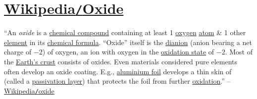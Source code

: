 \documentclass{article}
\begin{document}
\section{\href{https://en.wikipedia.org/wiki/Oxide}{Wikipedia\texttt{/}Oxide}}
``An \textit{oxide} is a \href{https://en.wikipedia.org/wiki/Chemical_compound}{chemical compound} containing at least 1 \href{https://en.wikipedia.org/wiki/Oxygen}{oxygen} \href{https://en.wikipedia.org/wiki/Atom}{atom} \& 1 other \href{https://en.wikipedia.org/wiki/Chemical_element}{element} in its \href{https://en.wikipedia.org/wiki/Chemical_formula}{chemical formula}. ``Oxide'' itself is the \href{https://en.wikipedia.org/wiki/Dianion}{dianion} (anion bearing a net charge of $-2$) of oxygen, an  ion with oxygen in the \href{https://en.wikipedia.org/wiki/Oxidation_state}{oxidation state} of $-2$. Most of the \href{https://en.wikipedia.org/wiki/Earth%27s_crust}{Earth's crust} consists of oxides. Even materials considered pure elements often develop an oxide coating. E.g., \href{https://en.wikipedia.org/wiki/Aluminium_foil}{aluminium foil} develops a thin skin of \ce{Al2O3} (called a \href{https://en.wikipedia.org/wiki/Passivation_(chemistry)}{passivation layer}) that protects the foil from further \href{https://en.wikipedia.org/wiki/Oxidation}{oxidation}.'' -- \href{https://en.wikipedia.org/wiki/Oxide}{Wikipedia\texttt{/}oxide}


\printbibliography[heading=bibintoc]
	
\end{document}
